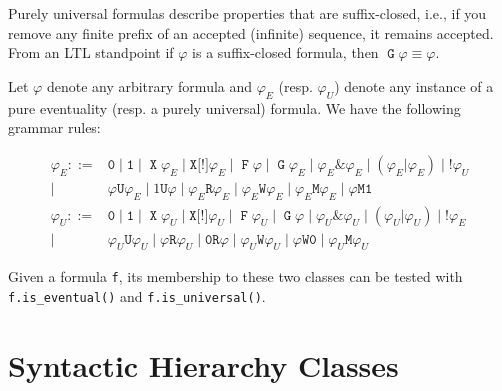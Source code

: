 \documentclass[a4paper,twoside,10pt,DIV=12]{scrreprt}
\DeclareMathOperator{\F}{\texttt{F}}
\DeclareMathOperator{\G}{\texttt{G}}
\newcommand{\U}{\mathbin{\texttt{U}}}
\newcommand{\R}{\mathbin{\texttt{R}}}
\DeclareMathOperator{\X}{\texttt{X}}
\newcommand{\StrongX}{\texttt{X[!]}}
\newcommand{\M}{\mathbin{\texttt{M}}}
\newcommand{\W}{\mathbin{\texttt{W}}}
\DeclareMathOperator{\NOT}{\texttt{!}}
\newcommand{\OR}{\mathbin{\texttt{|}}}
\newcommand{\AND}{\mathbin{\texttt{\&}}}
\newcommand{\0}{\texttt{0}}
\newcommand{\1}{\texttt{1}}
\begin{document}
Purely universal formulas describe properties that are
suffix-closed, i.e., if you remove any finite prefix of an accepted
(infinite) sequence, it remains accepted.  From an LTL standpoint if
$\varphi$ is a suffix-closed formula, then $\G\varphi \equiv \varphi$.


Let $\varphi$ denote any arbitrary formula and $\varphi_E$
(resp. $\varphi_U$) denote any instance of a pure eventuality
(resp. a purely universal) formula.  We have the following grammar
rules:

\begin{align*}
  \varphi_E ::={}& \0
           \mid \1
           \mid \X \varphi_E
           \mid \StrongX \varphi_E
           \mid \F \varphi
           \mid \G \varphi_E
           \mid \varphi_E\AND \varphi_E
           \mid (\varphi_E\OR \varphi_E)
           \mid \NOT\varphi_U\\
           \mid{}&\varphi  \U \varphi_E
           \mid 1        \U \varphi
           \mid \varphi_E\R \varphi_E
           \mid \varphi_E\W \varphi_E
           \mid \varphi_E\M \varphi_E
           \mid \varphi  \M \1\\
  \varphi_U ::={}& \0
           \mid \1
           \mid \X \varphi_U
           \mid \StrongX \varphi_U
           \mid \F \varphi_U
           \mid \G \varphi
           \mid \varphi_U\AND \varphi_U
           \mid (\varphi_U\OR \varphi_U)
           \mid \NOT\varphi_E\\
           \mid{}&\varphi_U\U \varphi_U
           \mid \varphi  \R \varphi_U
           \mid \0       \R \varphi
           \mid \varphi_U\W \varphi_U
           \mid \varphi  \W \0
           \mid \varphi_U\M \varphi_U
\end{align*}

Given a formula \texttt{f}, its membership to these two classes can be
tested with \texttt{f.is\_eventual()} and \texttt{f.is\_universal()}.

\section{Syntactic Hierarchy Classes}
\end{document}
